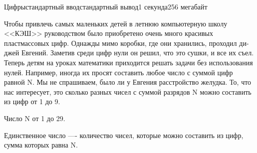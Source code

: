 \begin{problem}{Цифры}{стандартный ввод}{стандартный вывод}{1 секунда}{256 мегабайт}

Чтобы привлечь самых маленьких детей в летнюю компьютерную школу <<КЭШ>> руководством было приобретено очень много красивых пластмассовых цифр. Однажды мимо коробки, где они хранились, проходил ди-джей Евгений. Заметив среди цифр нули он решил, что это сушки, и все их съел. Теперь детям на уроках математики приходится решать задачи без использования нулей. Например, иногда их просят составить любое число с суммой цифр равной N. Мы не спрашиваем, было ли у Евгения расстройство желудка. То, что нас интересует, это сколько разных чисел с суммой разрядов N можно составить из цифр от 1 до 9.

\InputFile
Число N от 1 до 29.

\OutputFile
Единственное число ---- количество чисел, которые можно составить из цифр, сумма которых равна N.

\Example

\begin{example}
%
\end{example}

\end{problem}

